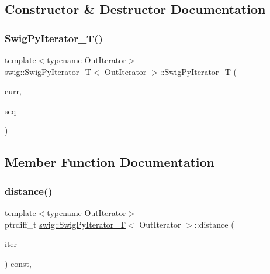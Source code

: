 \subsection{Constructor \& Destructor Documentation}
\mbox{\label{classswig_1_1_swig_py_iterator___t_aed627e359856103f6e9b2e939fc85d9c}} 
\subsubsection{\texorpdfstring{Swig\+Py\+Iterator\+\_\+\+T()}{SwigPyIterator\_T()}}
{\footnotesize\ttfamily template$<$typename Out\+Iterator$>$ \\
\hyperlink{classswig_1_1_swig_py_iterator___t}{swig\+::\+Swig\+Py\+Iterator\+\_\+T}$<$ Out\+Iterator $>$\+::\hyperlink{classswig_1_1_swig_py_iterator___t}{Swig\+Py\+Iterator\+\_\+T} (\begin{DoxyParamCaption}\item[{\hyperlink{classswig_1_1_swig_py_iterator___t_aec35545038c3d804975a147253f061e4}{out\+\_\+iterator}}]{curr,  }\item[{Py\+Object $\ast$}]{seq }\end{DoxyParamCaption})\hspace{0.3cm}{\ttfamily [inline]}}



\subsection{Member Function Documentation}
\mbox{\label{classswig_1_1_swig_py_iterator___t_ab98b853b7da59239d8b260be34dbda26}} 
\subsubsection{\texorpdfstring{distance()}{distance()}}
{\footnotesize\ttfamily template$<$typename Out\+Iterator$>$ \\
ptrdiff\+\_\+t \hyperlink{classswig_1_1_swig_py_iterator___t}{swig\+::\+Swig\+Py\+Iterator\+\_\+T}$<$ Out\+Iterator $>$\+::distance (\begin{DoxyParamCaption}\item[{const \hyperlink{structswig_1_1_swig_py_iterator}{Swig\+Py\+Iterator} \&}]{iter }\end{DoxyParamCaption}) const\hspace{0.3cm}{\ttfamily [inline]}, {\ttfamily [virtual]}}



